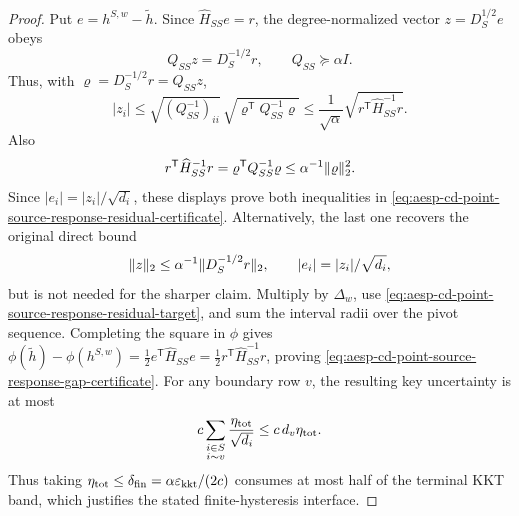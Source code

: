 \begin{proof}
Put \(e=h^{S,w}-\widetilde h\).  Since
\(\widehat H_{SS}e=r\), the degree-normalized vector
\(z=D_S^{1/2}e\) obeys
\begin{equation*}
 Q_{SS}z=D_S^{-1/2}r,
 \qquad Q_{SS}\succeq\alpha I.
\end{equation*}
Thus, with \(\varrho=D_S^{-1/2}r=Q_{SS}z\),
\begin{equation*}
 |z_i|
 \leq\sqrt{(Q_{SS}^{-1})_{ii}}\,
       \sqrt{\varrho^{\mathsf T}Q_{SS}^{-1}\varrho}
 \leq\frac1{\sqrt\alpha}
       \sqrt{r^{\mathsf T}\widehat H_{SS}^{-1}r}.
\end{equation*}
Also
\begin{equation*}
 r^{\mathsf T}\widehat H_{SS}^{-1}r
 =\varrho^{\mathsf T}Q_{SS}^{-1}\varrho
 \leq\alpha^{-1}\lVert\varrho\rVert_2^2.
\end{equation*}
Since \(|e_i|=|z_i|/\sqrt{d_i}\), these displays prove both inequalities in
\cref{eq:aesp-cd-point-source-response-residual-certificate}.  Alternatively,
the last one recovers the original direct bound
\begin{equation*}
 \lVert z\rVert_2\leq\alpha^{-1}\lVert D_S^{-1/2}r\rVert_2,
 \qquad
 |e_i|=|z_i|/\sqrt{d_i},
\end{equation*}
but is not needed for the sharper claim.  Multiply by
\(\Delta_w\), use
\cref{eq:aesp-cd-point-source-response-residual-target}, and sum the interval
radii over the pivot sequence.
Completing the square in \(\phi\) gives
\(\phi(\widetilde h)-\phi(h^{S,w})
=\tfrac12e^{\mathsf T}\widehat H_{SS}e
=\tfrac12r^{\mathsf T}\widehat H_{SS}^{-1}r\), proving
\cref{eq:aesp-cd-point-source-response-gap-certificate}.
For any boundary row \(v\), the resulting key uncertainty is at most
\begin{equation*}
 c\sum_{\substack{i\in S\\i\sim v}}\frac{\eta_{\rm tot}}{\sqrt{d_i}}
 \leq c\,d_v\eta_{\rm tot}.
\end{equation*}
Thus taking
\(\eta_{\rm tot}\leq\delta_{\rm fin}=\alpha\varepsilon_{\mathrm{kkt}}/(2c)\) consumes at most
half of the terminal KKT band, which justifies the stated finite-hysteresis
interface.
\end{proof}

